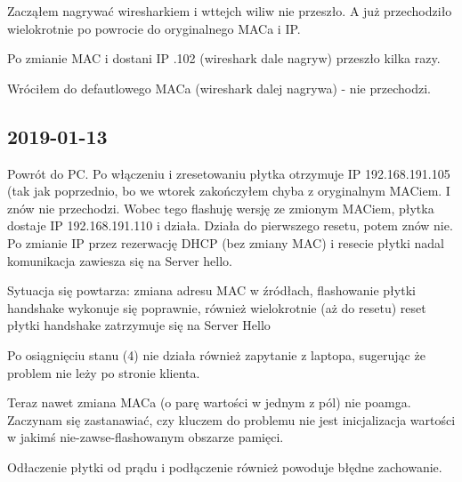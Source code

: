 Zacząłem nagrywać wiresharkiem i wttejch wiliw nie przeszło. A już przechodziło
wielokrotnie po powrocie do oryginalnego MACa i IP.

Po zmianie MAC i dostani IP .102 (wireshark dale nagryw) przeszło kilka razy.

Wróciłem do defautlowego MACa (wireshark dalej nagrywa) - nie przechodzi.

\subsection{2019-01-13}

Powrót do PC. Po włączeniu i zresetowaniu płytka otrzymuje IP 192.168.191.105 (tak jak poprzednio, bo we wtorek zakończyłem chyba z oryginalnym MACiem. I znów nie przechodzi.
Wobec tego flashuję wersję ze zmionym MACiem, płytka dostaje IP 192.168.191.110 i działa.
Działa do pierwszego resetu, potem znów nie.
Po zmianie IP przez rezerwację DHCP (bez zmiany MAC) i resecie płytki nadal komunikacja zawiesza się na Server hello.

Sytuacja się powtarza:
zmiana adresu MAC w źródłach, flashowanie płytki
handshake wykonuje się poprawnie, również wielokrotnie (aż do resetu)
reset płytki
handshake zatrzymuje się na Server Hello

Po osiągnięciu stanu (4) nie działa również zapytanie z laptopa, sugerując że problem nie leży po stronie klienta.

Teraz nawet zmiana MACa (o parę wartości w jednym z pól) nie poamga. Zaczynam się zastanawiać, czy kluczem do problemu nie jest inicjalizacja wartości w jakimś nie-zawse-flashowanym obszarze pamięci.


Odłaczenie płytki od prądu i podłączenie również powoduje błędne zachowanie.
